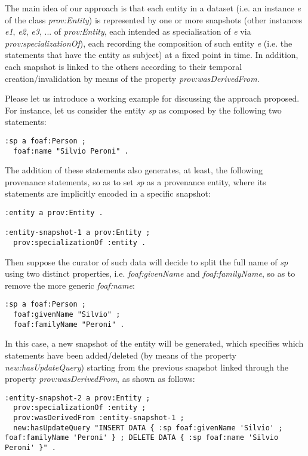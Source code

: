 \documentclass[runningheads,a4paper]{llncs}
\begin{document}
The main idea of our approach is that each entity in a dataset (i.e. an instance {\em e} of the class {\em prov:Entity}) is represented by one or more snapshots (other instances {\em e1}, {\em e2}, {\em e3}, ... of {\em prov:Entity}, each intended as specialisation of {\em e} via {\em prov:specializationOf}), each recording the composition of such entity {\em e} (i.e. the statements that have the entity as subject) at a fixed point in time. In addition, each snapshot is linked to the others according to their temporal creation/invalidation by means of the property {\em prov:wasDerivedFrom}. 

Please let us introduce a working example for discussing the approach proposed. For instance, let us consider the entity {\em sp} as composed by the following two statements:

\begin{lstlisting}[mathescape]
:sp a foaf:Person ; 
  foaf:name "Silvio Peroni" .
\end{lstlisting}

The addition of these statements also generates, at least, the following provenance statements, so as to set {\em sp} as a provenance entity, where its statements are implicitly encoded in a specific snapshot:

\begin{lstlisting}[mathescape]
:entity a prov:Entity .

:entity-snapshot-1 a prov:Entity ;
  prov:specializationOf :entity .
\end{lstlisting}

Then suppose the curator of such data will decide to split the full name of {\em sp} using two distinct properties, i.e. {\em foaf:givenName} and {\em foaf:familyName}, so as to remove the more generic {\em foaf:name}:

\begin{lstlisting}[mathescape]
:sp a foaf:Person ;
  foaf:givenName "Silvio" ;
  foaf:familyName "Peroni" .
\end{lstlisting}

In this case, a new snapshot of the entity will be generated, which specifies which statements have been added/deleted (by means of the property {\em new:hasUpdateQuery}) starting from the previous snapshot linked through the property {\em prov:wasDerivedFrom}, as shown as follows:

\begin{lstlisting}[mathescape]
:entity-snapshot-2 a prov:Entity ;
  prov:specializationOf :entity ;
  prov:wasDerivedFrom :entity-snapshot-1 ;
  new:hasUpdateQuery "INSERT DATA { :sp foaf:givenName 'Silvio' ; foaf:familyName 'Peroni' } ; DELETE DATA { :sp foaf:name 'Silvio Peroni' }" .
\end{lstlisting}
\end{document}
